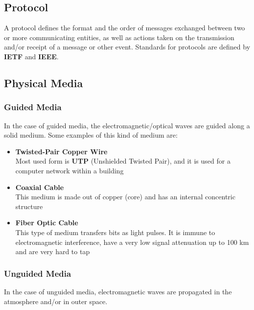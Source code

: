 \documentclass{article}
\begin{document}
\subsection{Protocol}
A protocol defines the format and the order of messages exchanged between two or more communicating entities, as well as actions taken on the transmission and/or receipt of a message or other event. Standards for protocols are defined by \textbf{IETF} and \textbf{IEEE}.

\subsection{Physical Media}
\subsubsection{Guided Media}
In the case of guided media, the electromagnetic/optical waves are guided along a solid medium. Some examples of this kind of medium are:

\begin{itemize}
	\item \textbf{Twisted-Pair Copper Wire}
	\vspace{.2cm} \\
	Most used form is \textbf{UTP} (Unshielded Twisted Pair), and it is used for a computer network within a building
	
	\item \textbf{Coaxial Cable}
	\vspace{.2cm} \\
	This medium is made out of copper (core) and has an internal concentric structure
	
	\item \textbf{Fiber Optic Cable}
	\vspace{.2cm} \\
	This type of medium transfers bits as light pulses. It is immune to electromagnetic interference, have a very low signal attenuation up to 100 km and are very hard to tap
\end{itemize}

\subsubsection{Unguided Media}
In the case of unguided media, electromagnetic waves are propagated in the atmosphere and/or in outer space.
\end{document}
